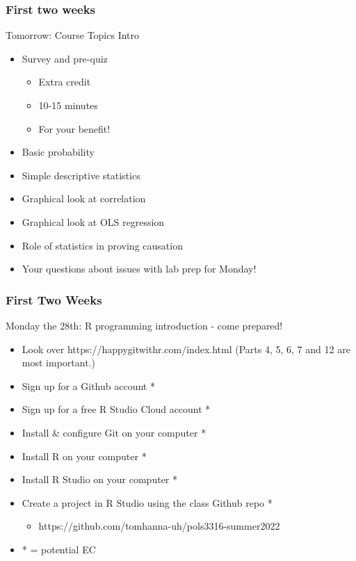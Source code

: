 \documentclass{beamer}
\begin{document}
\begin{frame}
\frametitle{First two weeks}
{\LARGE Tomorrow: Course Topics Intro}

	\begin{itemize}
	\item Survey and pre-quiz
	\begin{itemize}
	\item Extra credit
	\item 10-15 minutes
	\item For your benefit! 
	\end{itemize}
	\item Basic probability
	\item Simple descriptive statistics
	\item Graphical look at correlation
	\item Graphical look at OLS regression
	\item Role of statistics in proving causation
	\item Your questions about issues with lab prep for Monday!
	\end{itemize}

\end{frame}

\begin{frame}
\frametitle{First Two Weeks}
{\Large Monday the 28th: R programming introduction - come prepared!}
	\begin{itemize}
	\item Look over https://happygitwithr.com/index.html (Parts 4, 5, 6, 7 and 12 are most important.)
	\item Sign up for a Github account *
	\item Sign up for a free R Studio Cloud account *
	\item Install \& configure Git on your computer *
	\item Install R on your computer *
	\item Install R Studio on your computer *
	\item Create a project in R Studio using the class Github repo *
	\begin{itemize}
	\item https://github.com/tomhanna-uh/pols3316-summer2022
	\end{itemize}
	\item * = potential EC
	\end{itemize}
\end{frame}
\end{document}
